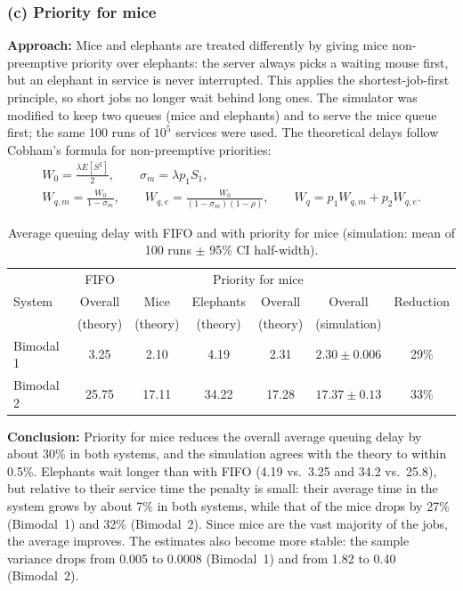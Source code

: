 ﻿\documentclass[12pt]{article}
\begin{document}
\subsubsection{(c) Priority for mice}

\textbf{Approach:} Mice and elephants are treated differently by giving mice
non-preemptive priority over elephants: the server always picks a waiting mouse
first, but an elephant in service is never interrupted. This applies the
shortest-job-first principle, so short jobs no longer wait behind long ones.
The simulator was modified to keep two queues (mice and elephants) and to serve
the mice queue first; the same 100 runs of $10^5$ services were used. The
theoretical delays follow Cobham's formula for non-preemptive priorities:
\begin{gather*}
W_0=\frac{\lambda E[S^2]}{2},\qquad \sigma_m=\lambda p_1 S_1,\\
W_{q,m}=\frac{W_0}{1-\sigma_m},\qquad
W_{q,e}=\frac{W_0}{(1-\sigma_m)(1-\rho)},\qquad
W_q=p_1W_{q,m}+p_2W_{q,e}.
\end{gather*}

\begin{table}[H]
    \centering
    \caption{Average queuing delay with FIFO and with priority for mice
    (simulation: mean of 100 runs $\pm$ 95\% CI half-width).}
    \label{tab:wl-prio}
    \begin{tabular}{l|c|cccc|c}
        & FIFO & \multicolumn{4}{c|}{Priority for mice} & \\
        System & Overall & Mice & Elephants & Overall & Overall & Reduction \\
               & (theory) & (theory) & (theory) & (theory) & (simulation) & \\
        \hline
        Bimodal 1 & 3.25  & 2.10  & 4.19  & 2.31  & $2.30\pm0.006$ & 29\% \\
        Bimodal 2 & 25.75 & 17.11 & 34.22 & 17.28 & $17.37\pm0.13$ & 33\% \\
    \end{tabular}
\end{table}

\textbf{Conclusion:} Priority for mice reduces the overall average queuing
delay by about 30\% in both systems, and the simulation agrees with the theory
to within 0.5\%. Elephants wait longer than with FIFO (4.19 vs.\ 3.25 and 34.2
vs.\ 25.8), but relative to their service time the penalty is small: their
average time in the system grows by about 7\% in both systems, while that of
the mice drops by 27\% (Bimodal~1) and 32\% (Bimodal~2). Since mice are the vast
majority of the jobs, the average improves. The estimates also become more
stable: the sample variance drops from 0.005 to 0.0008 (Bimodal~1) and from
1.82 to 0.40 (Bimodal~2).
\end{document}
